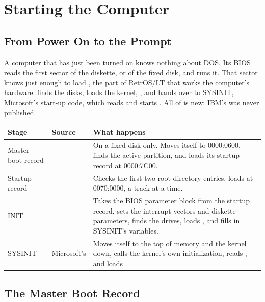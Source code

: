 \mwnewpart
\renewcommand\runningtitle{Section 3. Starting the Computer}
\chapter{Starting the Computer}
\sectioncontents

\section{From Power On to the Prompt}

\begin{plainwords}
A computer that has just been turned on knows nothing about DOS. Its BIOS
reads the first sector of the diskette, or of the fixed disk, and runs it.
That sector knows just enough to load , the part of
RetrOS/LT that works the computer's hardware.  finds the
disks, loads the kernel, , and hands over to SYSINIT,
Microsoft's start-up code, which reads  and starts
. All of  is new: IBM's was never
published.
\end{plainwords}

\begin{tabularx}{\textwidth}{@{}P{1.1in}P{1.2in}Y@{}}
\toprule
\textbf{Stage} & \textbf{Source} & \textbf{What happens}\\
\midrule
Master boot record &  & On a fixed disk only. Moves
itself to 0000:0600, finds the active partition, and loads its startup
record at 0000:7C00.\\
Startup record &  & Checks the first two root
directory entries, loads  at 0070:0000, a track at a
time.\\
INIT &  & Takes the BIOS parameter block from the
startup record, sets the interrupt vectors and diskette parameters, finds
the drives, loads , and fills in SYSINIT's variables.\\
SYSINIT & Microsoft's  & Moves itself to the top of
memory and the kernel down, calls the kernel's own initialization, reads
, and loads .\\
\bottomrule
\end{tabularx}

\section{The Master Boot Record}

